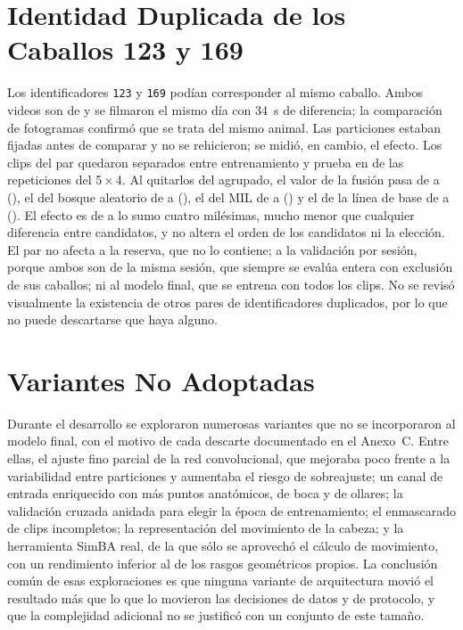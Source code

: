 \section{Identidad Duplicada de los Caballos 123 y 169}
Los identificadores \texttt{123} y \texttt{169} podían corresponder al mismo caballo. Ambos videos son de  y se filmaron el mismo día con 34~s de diferencia; la comparación de fotogramas confirmó que se trata del mismo animal. Las particiones estaban fijadas antes de comparar y no se rehicieron; se midió, en cambio, el efecto. Los \ParClips{} clips del par quedaron separados entre entrenamiento y prueba en \ParRepsSeparado{} de las \Repeticiones{} repeticiones del 5\,$\times$\,4. Al quitarlos del \fmacro{} agrupado, el valor de la fusión pasa de \ParFusionAntes{} a \ParFusionDespues{} (\ParFusionDif{}), el del bosque aleatorio de \ParRFAntes{} a \ParRFDespues{} (\ParRFDif{}), el del MIL de \ParMILAntes{} a \ParMILDespues{} (\ParMILDif{}) y el de la línea de base de \ParBaseAntes{} a \ParBaseDespues{} (\ParBaseDif{}). El efecto es de a lo sumo cuatro milésimas, mucho menor que cualquier diferencia entre candidatos, y no altera el orden de los candidatos ni la elección. El par no afecta a la reserva, que no lo contiene; a la validación por sesión, porque ambos son de la misma sesión, que siempre se evalúa entera con exclusión de sus caballos; ni al modelo final, que se entrena con todos los clips. No se revisó visualmente la existencia de otros pares de identificadores duplicados, por lo que no puede descartarse que haya alguno.

\section{Variantes No Adoptadas}
Durante el desarrollo se exploraron numerosas variantes que no se incorporaron al modelo final, con el motivo de cada descarte documentado en el Anexo~C. Entre ellas, el ajuste fino parcial de la red convolucional, que mejoraba poco frente a la variabilidad entre particiones y aumentaba el riesgo de sobreajuste; un canal de entrada enriquecido con más puntos anatómicos, de boca y de ollares; la validación cruzada anidada para elegir la época de entrenamiento; el enmascarado de clips incompletos; la representación del movimiento de la cabeza; y la herramienta SimBA real, de la que sólo se aprovechó el cálculo de movimiento, con un rendimiento inferior al de los rasgos geométricos propios. La conclusión común de esas exploraciones es que ninguna variante de arquitectura movió el resultado más que lo que lo movieron las decisiones de datos y de protocolo, y que la complejidad adicional no se justificó con un conjunto de este tamaño.

